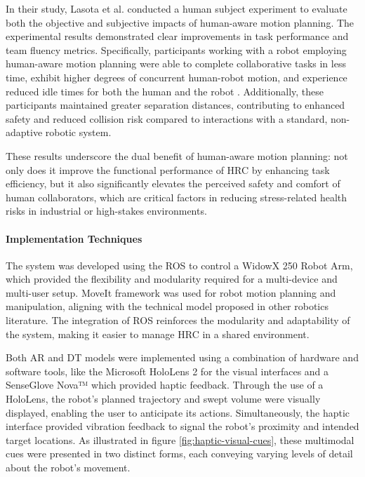     In their study, Lasota et al. conducted a human subject experiment to evaluate both the objective and subjective impacts of human-aware motion planning. The experimental results demonstrated clear improvements in task performance and team fluency metrics. Specifically, participants working with a robot employing human-aware motion planning were able to complete collaborative tasks in less time, exhibit higher degrees of concurrent human-robot motion, and experience reduced idle times for both the human and the robot \cite{doi:10.1177/0018720814565188}. Additionally, these participants maintained greater separation distances, contributing to enhanced safety and reduced collision risk compared to interactions with a standard, non-adaptive robotic system.

    These results underscore the dual benefit of human-aware motion planning: not only does it improve the functional performance of \ac{HRC} by enhancing task efficiency, but it also significantly elevates the perceived safety and comfort of human collaborators, which are critical factors in reducing stress-related health risks in industrial or high-stakes environments.


    \paragraph{\textbf{Implementation Techniques}}
    The system was developed using the \ac{ROS} to control a WidowX 250 Robot Arm, which provided the flexibility and modularity required for a multi-device and multi-user setup. MoveIt framework  was used for robot motion planning and manipulation, aligning with the technical model proposed in other robotics literature. The integration of \ac{ROS} reinforces the modularity and adaptability of the system, making it easier to manage \ac{HRC} in a shared environment.


    Both \ac{AR} and \ac{DT} models were implemented using a combination of hardware and software tools, like the Microsoft HoloLens 2 for the visual interfaces and a SenseGlove Nova™ which provided haptic feedback.
    Through the use of a HoloLens, the robot’s planned trajectory and swept volume were visually displayed, enabling the user to anticipate its actions. Simultaneously, the haptic interface provided vibration feedback to signal the robot’s proximity and intended target locations. As illustrated in figure \ref{fig:haptic-visual-cues}, these multimodal cues were presented in two distinct forms, each conveying varying levels of detail about the robot’s movement.

